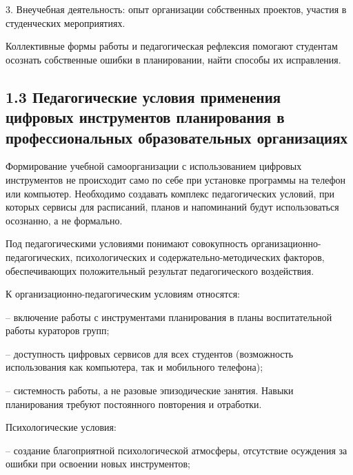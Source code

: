 \documentclass[
]{article}
\begin{document}
3. Внеучебная деятельность: опыт организации собственных проектов,
участия в студенческих мероприятиях.

Коллективные формы работы и педагогическая рефлексия помогают студентам
осознать собственные ошибки в планировании, найти способы их
исправления.

\subsection{\texorpdfstring{\textbf{1.3 Педагогические условия
применения цифровых инструментов планирования в профессиональных
образовательных
организациях}}{1.3 Педагогические условия применения цифровых инструментов планирования в профессиональных образовательных организациях}}\label{ux43fux435ux434ux430ux433ux43eux433ux438ux447ux435ux441ux43aux438ux435-ux443ux441ux43bux43eux432ux438ux44f-ux43fux440ux438ux43cux435ux43dux435ux43dux438ux44f-ux446ux438ux444ux440ux43eux432ux44bux445-ux438ux43dux441ux442ux440ux443ux43cux435ux43dux442ux43eux432-ux43fux43bux430ux43dux438ux440ux43eux432ux430ux43dux438ux44f-ux432-ux43fux440ux43eux444ux435ux441ux441ux438ux43eux43dux430ux43bux44cux43dux44bux445-ux43eux431ux440ux430ux437ux43eux432ux430ux442ux435ux43bux44cux43dux44bux445-ux43eux440ux433ux430ux43dux438ux437ux430ux446ux438ux44fux445}

Формирование учебной самоорганизации с использованием цифровых
инструментов не происходит само по себе при установке программы на
телефон или компьютер. Необходимо создавать комплекс педагогических
условий, при которых сервисы для расписаний, планов и напоминаний будут
использоваться осознанно, а не формально.

Под педагогическими условиями понимают совокупность
организационно-педагогических, психологических и
содержательно-методических факторов, обеспечивающих положительный
результат педагогического воздействия.

К организационно-педагогическим условиям относятся:

-- включение работы с инструментами планирования в планы воспитательной
работы кураторов групп;

-- доступность цифровых сервисов для всех студентов (возможность
использования как компьютера, так и мобильного телефона);

-- системность работы, а не разовые эпизодические занятия. Навыки
планирования требуют постоянного повторения и отработки.

Психологические условия:

-- создание благоприятной психологической атмосферы, отсутствие
осуждения за ошибки при освоении новых инструментов;
\end{document}
